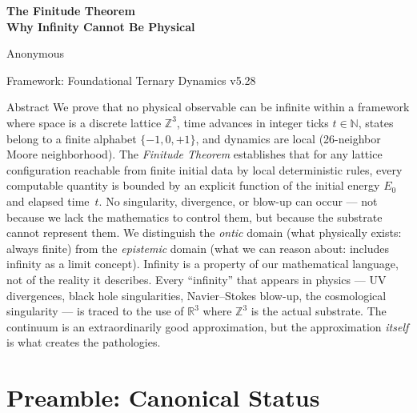 \documentclass[11pt]{article}
\theoremstyle{tight}
\theoremstyle{plainroman}
\newcommand{\R}{\mathbb{R}}
\newcommand{\Z}{\mathbb{Z}}
\newcommand{\N}{\mathbb{N}}
\begin{document}
\begin{titlepage}
\centering
\vspace*{1.8cm}
{\fontsize{22}{27}\selectfont\bfseries\color{accent}
The Finitude Theorem\\[0.35em]
Why Infinity Cannot Be Physical\par}
\vspace{0.8cm}
{\large Anonymous\par}
\vspace{0.3cm}
{\normalsize Framework: Foundational Ternary Dynamics v5.28\par}
\vspace{1.2cm}
\begin{minipage}{0.86\textwidth}
\begin{statusbox}{Abstract}
We prove that no physical observable can be infinite within a framework where space is a discrete lattice $\Z^3$, time advances in integer ticks $t\in\N$, states belong to a finite alphabet $\{-1,0,+1\}$, and dynamics are local (26-neighbor Moore neighborhood).
The \emph{Finitude Theorem} establishes that for any lattice configuration reachable from finite initial data by local deterministic rules, every computable quantity is bounded by an explicit function of the initial energy $E_0$ and elapsed time~$t$.
No singularity, divergence, or blow-up can occur --- not because we lack the mathematics to control them, but because the substrate cannot represent them.
We distinguish the \emph{ontic} domain (what physically exists: always finite) from the \emph{epistemic} domain (what we can reason about: includes infinity as a limit concept).
Infinity is a property of our mathematical language, not of the reality it describes.
Every ``infinity'' that appears in physics --- UV divergences, black hole singularities, Navier--Stokes blow-up, the cosmological singularity --- is traced to the use of $\R^3$ where $\Z^3$ is the actual substrate.
The continuum is an extraordinarily good approximation, but the approximation \emph{itself} is what creates the pathologies.
\end{statusbox}
\end{minipage}
\vfill
\end{titlepage}
\tableofcontents
\thispagestyle{empty}
\clearpage

\section*{Preamble: Canonical Status}
\end{document}
